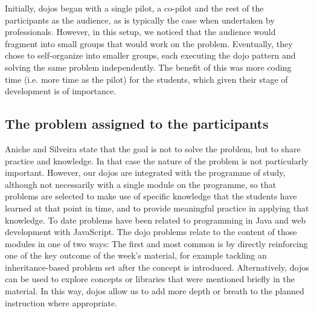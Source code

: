 Initially, dojos began with a single pilot, a co-pilot and the rest of the participants as the audience, as is typically the case when undertaken by professionals.  However, in this setup, we noticed that the audience would fragment into small groups that would work on the problem.  Eventually, they chose to self-organize into smaller groups, each executing the dojo pattern and solving the same problem independently.  The benefit of this was more coding time (i.e. more time as the pilot) for the students, which given their stage of development is of importance.
\subsection{The problem assigned to the participants}
Aniche and Silveira state that the goal is not to solve the problem, but to share practice and knowledge. In that case the nature of the problem is not particularly important. However, our dojos are integrated with the programme of study, although not necessarily with a single module on the programme, so that problems are selected to make use of specific knowledge that the students have learned at that point in time, and to provide meaningful practice in applying that knowledge. To date problems have been related to programming in Java and web development with JavaScript. The dojo problems relate to the content of those modules in one of two ways: The first and most common is by directly reinforcing one of the key outcome of the week's material, for example tackling an inheritance-based problem set after the concept is introduced. Alternatively, dojos can be used to explore concepts or libraries that were mentioned briefly in the material. In this way, dojos allow us to add more depth or breath to the planned instruction where appropriate.
